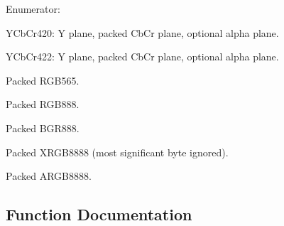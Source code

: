 \begin{Desc}
\item[Enumerator: ]\par
\begin{description}
\item[{\em 
REN\_\-NV12\label{shbeu_8h_a7c6f3f06390ea9d0f845a37c02ca4954ab77e03729897cbfcebdd291304f73175}
}]YCbCr420: Y plane, packed CbCr plane, optional alpha plane. \item[{\em 
REN\_\-NV16\label{shbeu_8h_a7c6f3f06390ea9d0f845a37c02ca4954a54ab0601ca051cc10ea1c067f021963e}
}]YCbCr422: Y plane, packed CbCr plane, optional alpha plane. \item[{\em 
REN\_\-RGB565\label{shbeu_8h_a7c6f3f06390ea9d0f845a37c02ca4954a384397bc7486130fb66aee4798dabd9a}
}]Packed RGB565. \item[{\em 
REN\_\-RGB24\label{shbeu_8h_a7c6f3f06390ea9d0f845a37c02ca4954a0374c5a25d96f9f362303b2f081874f4}
}]Packed RGB888. \item[{\em 
REN\_\-BGR24\label{shbeu_8h_a7c6f3f06390ea9d0f845a37c02ca4954adba4b520906167f79ad898b095b689f7}
}]Packed BGR888. \item[{\em 
REN\_\-RGB32\label{shbeu_8h_a7c6f3f06390ea9d0f845a37c02ca4954a6d8a0f39ba316142aa0efca71ceae2b7}
}]Packed XRGB8888 (most significant byte ignored). \item[{\em 
REN\_\-ARGB32\label{shbeu_8h_a7c6f3f06390ea9d0f845a37c02ca4954a528279835eb98b04e64c8e681ad69ef2}
}]Packed ARGB8888. \end{description}
\end{Desc}



\subsection{Function Documentation}
